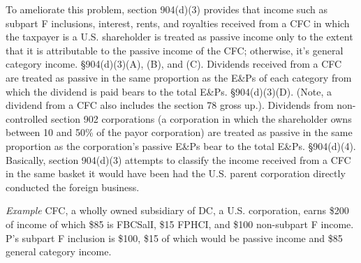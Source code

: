 To ameliorate this problem, section 904(d)(3) provides that income such as subpart F inclusions, interest, rents, and royalties received from a CFC in which the taxpayer is a U.S. shareholder is treated as passive income only to the extent that it is attributable to the passive income of the CFC; otherwise, it's general category income.  \S904(d)(3)(A), (B), and (C).  Dividends received from a CFC are treated as passive in the same proportion as the E\&Ps of each category from which the dividend is paid bears to the total E\&Ps.  \S904(d)(3)(D).   (Note, a dividend from a CFC also includes the section 78 gross up.).  Dividends from non-controlled section 902 corporations (a corporation in which the shareholder owns between 10 and 50\% of the payor corporation) are treated as passive in the same proportion as the corporation's passive E\&Ps bear to the total E\&Ps.  \S904(d)(4).  Basically, section 904(d)(3) attempts to classify the income received from a CFC in the same basket it would have been had the U.S. parent corporation directly conducted the foreign business.  

\emph{Example}  CFC, a wholly owned subsidiary of DC, a U.S. corporation, earns \$200 of income of which \$85 is FBCSalI, \$15 FPHCI, and \$100 non-subpart F income.  P's subpart F inclusion is \$100, \$15 of which would be passive income and \$85 general category income.  
 
